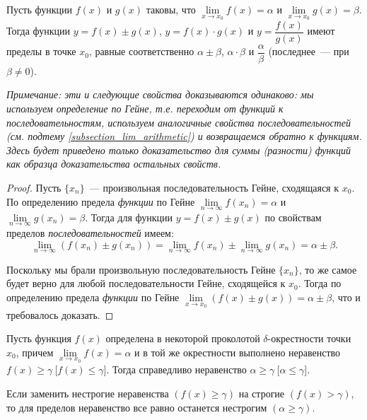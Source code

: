 
\begin{theorem} \label{theorem_lim_arithmetic}
Пусть функции \(f(x)\) и \(g(x)\) таковы, что \(\lim\limits_{x \to x_{0}}f(x) = \alpha\)
и \(\lim\limits_{x \to x_{0}} g(x) = \beta\). Тогда функции \(y = f(x) \pm g(x)\),
\(y=f(x)\cdot g(x)\) и \(y=\dfrac{f(x)}{g(x)}\) имеют пределы в точке \(x_{0}\),
равные соответственно \(\alpha \pm \beta\), \(\alpha \cdot \beta\) и \(\dfrac{\alpha}{\beta}\)
(последнее~--- при \(\beta \neq 0\)).

\textit{Примечание: эти и следующие свойства доказываются одинаково: мы используем определение
по Гейне, т.е. переходим от функций к последовательностям, используем аналогичные свойства
последовательностей (см. подтему \ref{subsection_lim_arithmetic}) и возвращаемся обратно к функциям. Здесь будет приведено
только доказательство для суммы (разности) функций как образца доказательства остальных свойств.} \\

\begin{proof}
Пусть \(\{x_{n}\}\)~--- произвольная последовательность Гейне, сходящаяся к \(x_{0}\).
По определению предела \textit{функции} по Гейне
\(\lim\limits_{n \to \infty}{f(x_{n})} = \alpha\) и
\(\lim\limits_{n \to \infty}{g(x_{n})} = \beta\). Тогда для функции \(y = f(x) \pm g(x)\)
по свойствам пределов \textit{последовательностей} имеем:
\[
\lim_{ n \to \infty }(f(x_{n}) \pm g(x_{n})) = \lim_{ n \to \infty } f(x_{n}) \pm
\lim_{ n \to \infty } g(x_{n}) = \alpha \pm \beta.
\]

Поскольку мы брали произвольную последовательность Гейне \(\{x_{n}\}\), то же самое
будет верно для любой последовательности Гейне, сходящейся к \(x_{0}\).
Тогда по определению предела \textit{функции} по Гейне
\(\lim\limits_{x \to x_{0}}{(f(x) \pm g(x))} = \alpha \pm \beta\),
что и требовалось доказать.
\end{proof}
\end{theorem}

\begin{theorem}
Пусть функция \(f(x)\) определена в некоторой проколотой \(\delta\)-окрестности
точки \(x_{0}\), причем \(\lim\limits_{x \to x_{0}} f(x) = \alpha\) и в той же окрестности
выполнено неравенство \({f(x) \geq \gamma ~ \Big[ f(x) \leq \gamma \Big]}\). Тогда справедливо
неравенство \(\alpha \geq \gamma ~ \Big[ \alpha \leq \gamma \Big]\).
\end{theorem}

\begin{note}
Если заменить нестрогие неравенства \((f(x) \geq \gamma)\) на строгие \((f(x) > \gamma)\),
то для пределов неравенство все равно останется нестрогим \((\alpha \geq \gamma)\).
\end{note}

